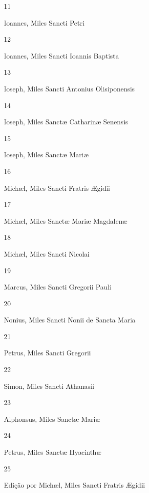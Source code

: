 \documentclass[paper=a5,10pt,openany]{scrbook}
\begin{document}
\begin{paracol}{2}
\switchcolumn
\begin{nscenter}11\end{nscenter}
\switchcolumn*
Ioannes, Miles Sancti Petri
\switchcolumn
\begin{nscenter}12\end{nscenter}
\switchcolumn*
Ioannes, Miles Sancti Ioannis Baptista
\switchcolumn
\begin{nscenter}13\end{nscenter}
\switchcolumn*
Ioseph, Miles Sancti Antonius Olisiponensis
\switchcolumn
\begin{nscenter}14\end{nscenter}
\switchcolumn*
Ioseph, Miles Sanctæ Catharinæ Senensis
\switchcolumn
\begin{nscenter}15\end{nscenter}
\switchcolumn*
Ioseph, Miles Sanctæ Mariæ
\switchcolumn
\begin{nscenter}16\end{nscenter}
\switchcolumn*
Michæl, Miles Sancti Fratris Ægidii
\switchcolumn
\begin{nscenter}17\end{nscenter}
\switchcolumn*
Michæl, Miles Sanctæ Mariæ Magdalenæ
\switchcolumn
\begin{nscenter}18\end{nscenter}
\switchcolumn*
Michæl, Miles Sancti Nicolai
\switchcolumn
\begin{nscenter}19\end{nscenter}
\switchcolumn*
Marcus, Miles Sancti Gregorii Pauli
\switchcolumn
\begin{nscenter}20\end{nscenter}
\switchcolumn*
Nonius, Miles Sancti Nonii de Sancta Maria
\switchcolumn
\begin{nscenter}21\end{nscenter}
\switchcolumn*
Petrus, Miles Sancti Gregorii
\switchcolumn
\begin{nscenter}22\end{nscenter}
\switchcolumn*
Simon, Miles Sancti Athanasii
\switchcolumn
\begin{nscenter}23\end{nscenter}
\switchcolumn*
Alphonsus, Miles Sanctæ Mariæ
\switchcolumn
\begin{nscenter}24\end{nscenter}
\switchcolumn*
Petrus, Miles Sanctæ Hyacinthæ
\switchcolumn
\begin{nscenter}25\end{nscenter}
\end{paracol}

\mbox{}
\vfill
\begin{nscenter}
  Edição por Michæl, Miles Sancti Fratris Ægidii
\end{nscenter}
\end{document}
